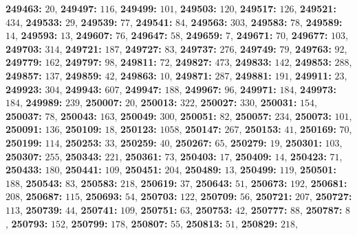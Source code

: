 \textsf{\bfseries 249463:} $20$, \textsf{\bfseries 249497:} $116$, \textsf{\bfseries 249499:} $101$, \textsf{\bfseries 249503:} $120$, \textsf{\bfseries 249517:} $126$, \textsf{\bfseries 249521:} $434$, \textsf{\bfseries 249533:} $29$, \textsf{\bfseries 249539:} $77$, \textsf{\bfseries 249541:} $84$, \textsf{\bfseries 249563:} $303$, \textsf{\bfseries 249583:} $78$, \textsf{\bfseries 249589:} $14$, \textsf{\bfseries 249593:} $13$, \textsf{\bfseries 249607:} $76$, \textsf{\bfseries 249647:} $58$, \textsf{\bfseries 249659:} $7$, \textsf{\bfseries 249671:} $70$, \textsf{\bfseries 249677:} $103$, \textsf{\bfseries 249703:} $314$, \textsf{\bfseries 249721:} $187$, \textsf{\bfseries 249727:} $83$, \textsf{\bfseries 249737:} $276$, \textsf{\bfseries 249749:} $79$, \textsf{\bfseries 249763:} $92$, \textsf{\bfseries 249779:} $162$, \textsf{\bfseries 249797:} $98$, \textsf{\bfseries 249811:} $72$, \textsf{\bfseries 249827:} $473$, \textsf{\bfseries 249833:} $142$, \textsf{\bfseries 249853:} $288$, \textsf{\bfseries 249857:} $137$, \textsf{\bfseries 249859:} $42$, \textsf{\bfseries 249863:} $10$, \textsf{\bfseries 249871:} $287$, \textsf{\bfseries 249881:} $191$, \textsf{\bfseries 249911:} $23$, \textsf{\bfseries 249923:} $304$, \textsf{\bfseries 249943:} $607$, \textsf{\bfseries 249947:} $188$, \textsf{\bfseries 249967:} $96$, \textsf{\bfseries 249971:} $184$, \textsf{\bfseries 249973:} $184$, \textsf{\bfseries 249989:} $239$, \textsf{\bfseries 250007:} $20$, \textsf{\bfseries 250013:} $322$, \textsf{\bfseries 250027:} $330$, \textsf{\bfseries 250031:} $154$, \textsf{\bfseries 250037:} $78$, \textsf{\bfseries 250043:} $163$, \textsf{\bfseries 250049:} $300$, \textsf{\bfseries 250051:} $82$, \textsf{\bfseries 250057:} $234$, \textsf{\bfseries 250073:} $101$, \textsf{\bfseries 250091:} $136$, \textsf{\bfseries 250109:} $18$, \textsf{\bfseries 250123:} $1058$, \textsf{\bfseries 250147:} $267$, \textsf{\bfseries 250153:} $41$, \textsf{\bfseries 250169:} $70$, \textsf{\bfseries 250199:} $114$, \textsf{\bfseries 250253:} $33$, \textsf{\bfseries 250259:} $40$, \textsf{\bfseries 250267:} $65$, \textsf{\bfseries 250279:} $19$, \textsf{\bfseries 250301:} $103$, \textsf{\bfseries 250307:} $255$, \textsf{\bfseries 250343:} $221$, \textsf{\bfseries 250361:} $73$, \textsf{\bfseries 250403:} $17$, \textsf{\bfseries 250409:} $14$, \textsf{\bfseries 250423:} $71$, \textsf{\bfseries 250433:} $180$, \textsf{\bfseries 250441:} $109$, \textsf{\bfseries 250451:} $204$, \textsf{\bfseries 250489:} $13$, \textsf{\bfseries 250499:} $119$, \textsf{\bfseries 250501:} $188$, \textsf{\bfseries 250543:} $83$, \textsf{\bfseries 250583:} $218$, \textsf{\bfseries 250619:} $37$, \textsf{\bfseries 250643:} $51$, \textsf{\bfseries 250673:} $192$, \textsf{\bfseries 250681:} $208$, \textsf{\bfseries 250687:} $115$, \textsf{\bfseries 250693:} $54$, \textsf{\bfseries 250703:} $122$, \textsf{\bfseries 250709:} $56$, \textsf{\bfseries 250721:} $207$, \textsf{\bfseries 250727:} $113$, \textsf{\bfseries 250739:} $44$, \textsf{\bfseries 250741:} $109$, \textsf{\bfseries 250751:} $63$, \textsf{\bfseries 250753:} $42$, \textsf{\bfseries 250777:} $88$, \textsf{\bfseries 250787:} $8$, \textsf{\bfseries 250793:} $152$, \textsf{\bfseries 250799:} $178$, \textsf{\bfseries 250807:} $55$, \textsf{\bfseries 250813:} $51$, \textsf{\bfseries 250829:} $218$, 
